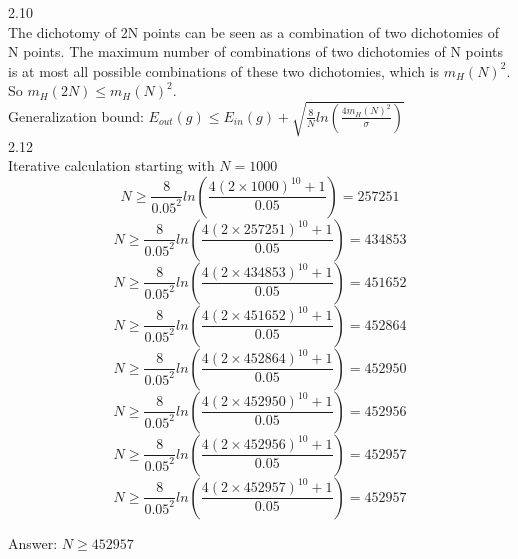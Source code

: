 \documentclass[12pt]{article}
\begin{document}
2.10\\
The dichotomy of 2N points can be seen as a combination of two dichotomies of N points. The maximum number of combinations of two dichotomies of N points is at most all possible combinations of these two dichotomies, which is $m_H(N)^2$. So $m_H(2N) \leq m_H(N)^2$. \\
Generalization bound: $E_{out}(g)\leq E_{in}(g)+\sqrt{\frac{8}{N}ln(\frac{4m_H(N)^2}{\sigma})}$\\

2.12\\
Iterative calculation starting with $N=1000$\\
$$N\geq \frac{8}{0.05^2}ln(\frac{4(2\times 1000)^{10}+1}{0.05})=257251$$
$$N\geq \frac{8}{0.05^2}ln(\frac{4(2\times 257251)^{10}+1}{0.05})=434853$$
$$N\geq \frac{8}{0.05^2}ln(\frac{4(2\times 434853)^{10}+1}{0.05})=451652$$
$$N\geq \frac{8}{0.05^2}ln(\frac{4(2\times 451652)^{10}+1}{0.05})=452864$$
$$N\geq \frac{8}{0.05^2}ln(\frac{4(2\times 452864)^{10}+1}{0.05})=452950$$
$$N\geq \frac{8}{0.05^2}ln(\frac{4(2\times 452950)^{10}+1}{0.05})=452956$$
$$N\geq \frac{8}{0.05^2}ln(\frac{4(2\times 452956)^{10}+1}{0.05})=452957$$
$$N\geq \frac{8}{0.05^2}ln(\frac{4(2\times 452957)^{10}+1}{0.05})=452957$$

Answer: $N\geq452957$\\
\end{document}
